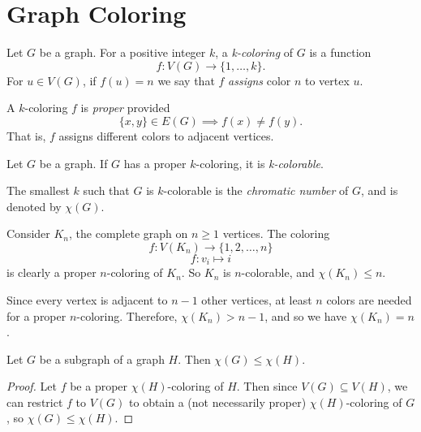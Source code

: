\documentclass[12pt]{article}
\begin{document}
\section{Graph Coloring}

\begin{defn}
    Let $G$ be a graph. For a positive integer $k$, a \emph{k-coloring} of $G$ is a function
    \[f: V(G) \to \{1, \ldots, k\}.\] For $u \in V(G)$, if $f(u) = n$ we say that $f$ \emph{assigns} color $n$ to vertex $u$.
\end{defn}

\begin{defn}
    A $k$-coloring $f$ is \emph{proper} provided
    \[\{x, y\} \in E(G) \implies f(x) \neq f(y).\]
    That is, $f$ assigns different colors to adjacent vertices.
\end{defn}

\begin{defn}
    Let $G$ be a graph. If $G$ has a proper $k$-coloring, it is \emph{k-colorable}.
\end{defn}

\begin{defn}
    The smallest $k$ such that $G$ is $k$-colorable is the \emph{chromatic number} of $G$, and is denoted by $\chi(G)$.
\end{defn}

\begin{exmp}
    Consider $K_n$, the complete graph on $n \geq 1$ vertices. The coloring
    \[f: V(K_n) \to \{1, 2, \ldots, n\}\]
    \[f: v_i \mapsto i\]
    is clearly a proper $n$-coloring of $K_n$. So $K_n$ is $n$-colorable, and $\chi(K_n) \leq n$.

    Since every vertex is adjacent to $n-1$ other vertices, at least $n$ colors are needed for a proper $n$-coloring. Therefore, $\chi(K_n) > n-1$, and so we have $\chi(K_n) = n$.
\end{exmp}

\begin{prop}\label{subgraph-chromatic-number}
    Let $G$ be a subgraph of a graph $H$. Then $\chi(G) \leq \chi(H)$.
\end{prop}

\begin{proof}
    Let $f$ be a proper $\chi(H)$-coloring of $H$. Then since $V(G) \subseteq V(H)$, we can restrict $f$ to $V(G)$ to obtain a (not necessarily proper) $\chi(H)$-coloring of $G$, so $\chi(G) \leq \chi(H)$.
\end{proof}
\end{document}
